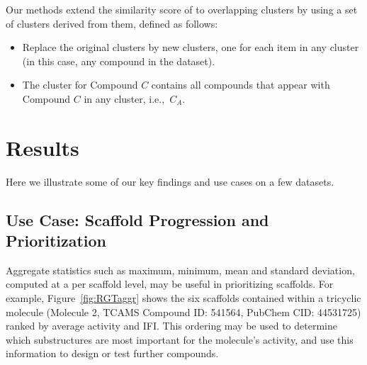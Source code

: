 \documentclass[journal=jacsat,manuscript=article]{achemso}
\newcommand*\fref[1]{Figure~\ref{fig:#1}}
\newcommand*\ie{i.e.,~}
\begin{document}
Our methods extend the similarity score of \citet{Torres2009} to
overlapping clusters by using a set of clusters derived from them,
defined as follows:
\begin{itemize}
\item Replace the original clusters by new clusters, one for each item
  in any cluster (in this case, any compound in the dataset).
\item The cluster for Compound $C$ contains all compounds that appear
  with Compound $C$ in any cluster, \ie $C_A$.
\end{itemize}


\section{Results}
\label{sec:results}
Here we illustrate some of our key findings and use cases on a few datasets. 

\subsection{Use Case: Scaffold Progression and Prioritization}
Aggregate statistics such as maximum, minimum, mean and standard
deviation, computed at a per scaffold level, may be useful in
prioritizing scaffolds. For example, \fref{RGTaggr} shows the six
scaffolds contained within a tricyclic molecule (Molecule
2, TCAMS Compound ID: 541564, PubChem CID: 44531725)
ranked by average activity and IFI. This ordering may
be used to determine which substructures are most important for the
molecule's activity, and use this information to design or test
further compounds.
\end{document}
